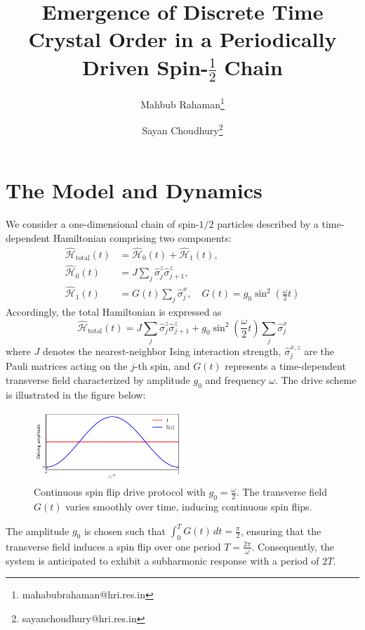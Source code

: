 \documentclass[a4paper, 11pt]{article}
\title{Emergence of Discrete Time Crystal Order in a Periodically Driven Spin-$\frac{1}{2}$ Chain}
\author[1]{Mahbub Rahaman\thanks{mahabubrahaman@hri.res.in}}
\author[1]{Sayan Choudhury\thanks{sayanchoudhury@hri.res.in}}
\affil[1]{\small Harish-Chandra Research Institute, HBNI, Chhatnag Road, Jhunsi, Praygraj, UP - 211019, India}
\date{}
\begin{document}
\maketitle

\section{The Model and Dynamics}
We consider a one-dimensional chain of spin-$1/2$ particles described by a time-dependent Hamiltonian comprising two components:
\begin{align}
    \hat{\mathcal{H}}_{\text{total}}(t) &=  \hat{\mathcal{H}}_0(t) + \hat{\mathcal{H}}_1(t), \\
    \hat{\mathcal{H}}_0(t) &= J\sum_{j} \hat{\sigma}_j^z \hat{\sigma}_{j+1}^z, \\
    \hat{\mathcal{H}}_1(t) &= G(t)\sum_{j}\hat{\sigma}_j^x, \quad G(t) = g_0\sin^2\left(\frac{\omega}{2} t\right)
\end{align}
Accordingly, the total Hamiltonian is expressed as
\begin{equation}
    \boxed{
        \hat{\mathcal{H}}_{\text{total}}(t) =  J\sum_{j} \hat{\sigma}_j^z \hat{\sigma}_{j+1}^z + g_0\sin^2\left(\frac{\omega}{2} t\right)\sum_{j}\hat{\sigma}_j^x
    }
\end{equation}
where $J$ denotes the nearest-neighbor Ising interaction strength, $\hat{\sigma}_j^{x,z}$ are the Pauli matrices acting on the $j$-th spin, and $G(t)$ represents a time-dependent transverse field characterized by amplitude $g_0$ and frequency $\omega$. 
The drive scheme is illustrated in the figure below:
\begin{figure}[h!]
    \centering
    \includegraphics[width=0.5\textwidth]{figs/continuous_flip_drive.pdf}
    \caption{Continuous spin flip drive protocol with $g_0 = \frac{\omega}{2}$. The transverse field $G(t)$ varies smoothly over time, inducing continuous spin flips.}
\end{figure}
The amplitude $g_0$ is chosen such that $\displaystyle \int_0^T G(t)\,dt = \frac{\pi}{2}$, ensuring that the transverse field induces a spin flip over one period $T = \frac{2\pi}{\omega}$. Consequently, the system is anticipated to exhibit a subharmonic response with a period of $2T$.
\end{document}
